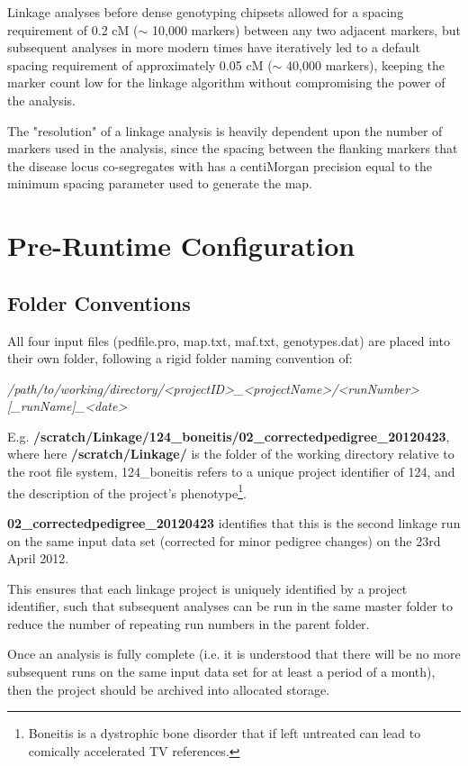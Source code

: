 Linkage analyses before dense genotyping chipsets allowed for a spacing requirement of 0.2 cM ($\sim$ 10,000 markers) between any two adjacent markers, but subsequent analyses in more modern times have iteratively led to a default spacing requirement of approximately 0.05 cM ($\sim$ 40,000 markers), keeping the marker count low for the linkage algorithm without compromising the power of the analysis.

The "resolution" of a linkage analysis is heavily dependent upon the number of markers used in the analysis, since the spacing between the flanking markers that the disease locus co-segregates with has a centiMorgan precision equal to the minimum spacing parameter used to generate the map.


\section{Pre-Runtime Configuration}

\subsection{Folder Conventions}\label{ref:meth:foldconv}

All four input files (pedfile.pro, map.txt, maf.txt, genotypes.dat) are placed into their own folder, following a rigid folder naming convention of:

\textit{\footnotesize /path/to/working/directory/<projectID>\_<projectName>/<runNumber>[\_runName]\_<date>}

E.g. {\bf\footnotesize /scratch/Linkage/124\_boneitis/02\_correctedpedigree\_20120423}, where here {\bf\footnotesize /scratch/Linkage/} is the folder of the working directory relative to the root file system, 124\_boneitis refers to a unique project identifier of 124, and the description of the project's phenotype\footnote{Boneitis is a dystrophic bone disorder that if left untreated can lead to comically accelerated TV references.}.

{\bf\footnotesize 02\_correctedpedigree\_20120423} identifies that this is the second linkage run on the same input data set (corrected for minor pedigree changes) on the 23rd April 2012.

This ensures that each linkage project is uniquely identified by a project identifier, such that subsequent analyses can be run in the same master folder to reduce the number of repeating run numbers in the parent folder.

Once an analysis is fully complete (i.e. it is understood that there will be no more subsequent runs on the same input data set for at least a period of a month), then the project should be archived into allocated storage.


